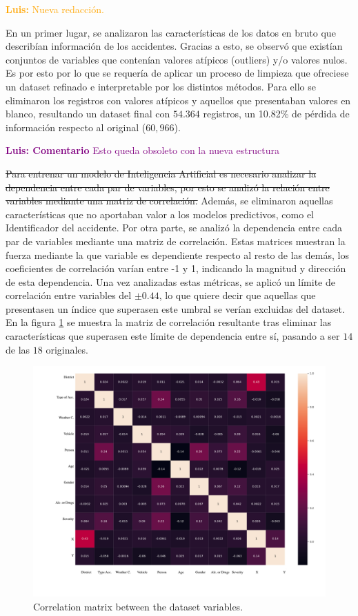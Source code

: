 \documentclass{uathesis-es}
\begin{document}
{	\textcolor{orange}{\textbf{Luis: } Nueva redacción.}
	
	En un primer lugar, se analizaron las características de los datos en bruto que describían información de los accidentes. Gracias a esto, se observó que existían conjuntos de variables que contenían valores atípicos (outliers) y/o valores nulos. Es por esto por lo que se requería de aplicar un proceso de limpieza que ofreciese un dataset refinado e interpretable por los distintos métodos. Para ello se eliminaron los registros con valores atípicos y aquellos que presentaban valores en blanco, resultando un dataset final con $54.364$ registros, un 10.82\% de pérdida de información respecto al original ($60,966$).
	
	\textcolor{purple}{\textbf{Luis: Comentario} Esto queda obsoleto con la nueva estructura}
	
	\sout{Para entrenar un modelo de Inteligencia Artificial es necesario analizar la dependencia entre cada par de variables, por esto se analizó la relación entre variables mediante una matriz de correlación.} Además, se eliminaron aquellas características que no aportaban valor a los modelos predictivos, como el Identificador del accidente. Por otra parte, se analizó la dependencia entre cada par de variables mediante una matriz de correlación. Estas matrices muestran la fuerza mediante la que variable es dependiente respecto al resto de las demás, los coeficientes de correlación varían entre -1 y 1, indicando la magnitud y dirección de esta dependencia. Una vez analizadas estas métricas, se aplicó un límite de correlación entre variables del $\pm 0.44$, lo que quiere decir que aquellas que presentasen un índice que superasen este umbral se verían excluidas del dataset. En la figura \ref{CorrelationMatrix} se muestra la matriz de correlación resultante tras eliminar las características que superasen este límite de dependencia entre sí, pasando a ser $14$ de las $18$ originales.
	
	
	\begin{figure}[H]
		\centering
		\includegraphics[width=12cm]{Figures/1stPaper/CorrelationMatrix.png}
		\caption{Correlation matrix between the dataset variables.}
		\label{CorrelationMatrix}
	\end{figure}
	
}
\end{document}

